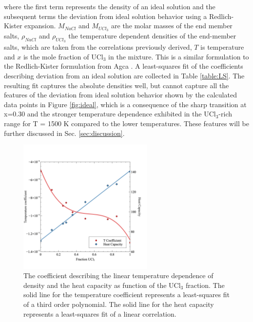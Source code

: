 \documentclass[preprint,3p,10pt,onecolumn,number,sort&compress]{elsarticle}
\begin{document}
{\noindent where the first term represents the density of an ideal solution and the subsequent terms the deviation from ideal solution behavior using a Redlich-Kister expansion. $M_{NaCl}$ and $M_{UCl_3}$ are the molar masses of the end member salts, $\rho_{NaCl}$ and $\rho_{UCl_3}$ the temperature dependent densities of the end-member salts, which are taken from the correlations previously derived, $T$ is temperature and $x$ is the mole fraction of UCl$_3$ in the mixture. This is a similar formulation to the Redlich-Kister formulation from Agca \cite{agca2022}. A least-squares fit of the coefficients describing deviation from an ideal solution are collected in Table \ref{table:LS}. 
 The resulting fit captures the absolute densities well, but cannot capture all the features of the deviation from ideal solution behavior shown by the calculated data points in Figure \ref{fig:ideal}, which is a consequence of the sharp transition at x=0.30 and the stronger temperature dependence exhibited in the UCl$_3$-rich range for T = 1500 K compared to the lower temperatures. These features will be further discussed in Sec. \ref{sec:discussion}.

\begin{figure}[htb]
\centering
\includegraphics[width=0.6\textwidth]{fig9.jpg}
\caption{The coefficient describing the linear temperature dependence of density and the heat capacity as function of the UCl$_3$ fraction. The solid line for the temperature coefficient represents a least-squares fit of a third order polynomial. The solid line for the heat capacity represents a least-squares fit of a linear correlation.}
\label{fig:TandCp}
\end{figure}

}
\end{document}
